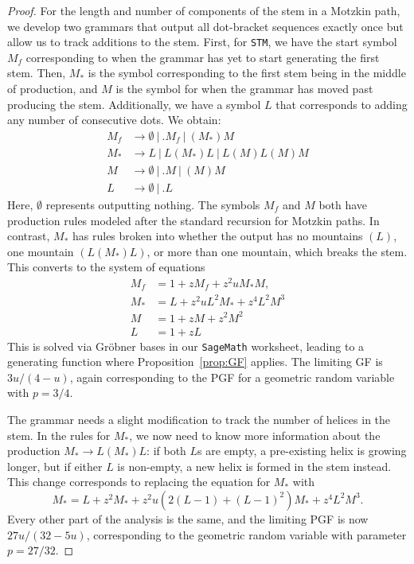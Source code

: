 \documentclass[10pt,a4paper]{amsart}
\newcommand{\STM}{{\tt STM}}
\begin{document}
\begin{proof}
    For the length and number of components of the stem in a Motzkin path, we develop two grammars that output all dot-bracket sequences exactly once but allow us to track additions to the stem.  First, for \STM, we have the start symbol $M_f$ corresponding to when the grammar has yet to start generating the first stem.  Then, $M_*$ is the symbol corresponding to the first stem being in the middle of production, and $M$ is the symbol for when the grammar has moved past producing the stem.  Additionally, we have a symbol $L$ that corresponds to adding any number of consecutive dots.  We obtain:
    \begin{align*}
        M_f &\to \emptyset\ \big|\ .M_f\ \big|\ (M_*)M\\
        M_* &\to L\ \big|\ L(M_*)L\ \big|\ L(M)L(M)M\\
        M &\to \emptyset \ \big|\ .M \ \big|\ (M)M\\
        L &\to \emptyset \ \big|\ .L
    \end{align*}
    Here, $\emptyset$ represents outputting nothing.  The symbols $M_f$ and $M$ both have production rules modeled after the standard recursion for Motzkin paths.  In contrast, $M_*$ has rules broken into whether the output has no mountains $(L)$, one mountain $(L(M_*)L)$, or more than one mountain, which breaks the stem.  This converts to the system of equations
    \begin{align*}
        M_f &= 1 + zM_f + z^2uM_*M,\\
        M_* &= L + z^2uL^2M_* + z^4L^2M^3\\
        M&=1 + zM + z^2M^2\\
        L &= 1+zL
    \end{align*}
    This is solved via Gr\"{o}bner bases in our {\tt SageMath} worksheet, leading to a generating function where Proposition~\ref{prop:GF} applies.  The limiting GF is $3u/(4-u)$, again corresponding to the PGF for a geometric random variable with $p = 3/4$.

    The grammar needs a slight modification to track the number of helices in the stem.  In the rules for $M_*$, we now need to know more information about the production $M_* \to L(M_*)L$: if both $L$s are empty, a pre-existing helix is growing longer, but if either $L$ is non-empty, a new helix is formed in the stem instead.  This change corresponds to replacing the equation for $M_*$ with
    \[
    M_* = L + z^2M_* + z^2u(2(L-1) + (L-1)^2)M_* + z^4L^2M^3.
    \]
    Every other part of the analysis is the same, and the limiting PGF is now $27u/(32 - 5u)$, corresponding to the geometric random variable with parameter $p = 27/32$.
\end{proof}
\end{document}
